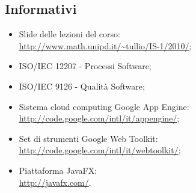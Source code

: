 \subsection{Informativi}
\begin{itemize}
  \item Slide delle lezioni del corso:\\
  \url{http://www.math.unipd.it/~tullio/IS-1/2010/};
  \item ISO/IEC 12207 - Processi Software;
  \item ISO/IEC 9126 - Qualit\`a Software;
  \item Sistema cloud computing Google App Engine:\\
  \url{http://code.google.com/intl/it/appengine/};
  \item Set di strumenti Google Web Toolkit:\\
  \url{http://code.google.com/intl/it/webtoolkit/};
  \item Piattaforma JavaFX:\\
  \url{http://javafx.com/}.
\end{itemize}

